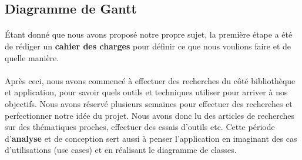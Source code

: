 \documentclass{report}
\begin{document}
			\newpage
			\subsection{Diagramme de Gantt}
			\paragraph{}
			Étant donné que nous avons proposé notre propre sujet, la première étape a été de rédiger un \textbf{cahier des charges} pour définir ce que nous voulions faire et de quelle manière.
			\paragraph{}
			Après ceci, nous avons commencé à effectuer des recherches du côté bibliothèque et application, pour savoir quels outils et techniques utiliser pour arriver à nos objectifs. 
		  Nous avons réservé plusieurs semaines pour effectuer des recherches et perfectionner notre idée du projet. Nous avons donc lu des articles de recherches sur des thématiques proches, effectuer des essais d'outils etc. Cette période d'\textbf{analyse} et de conception sert aussi à penser l'application en imaginant des cas d'utilisations (use cases) et en réalisant le diagramme de classes.
\end{document}
